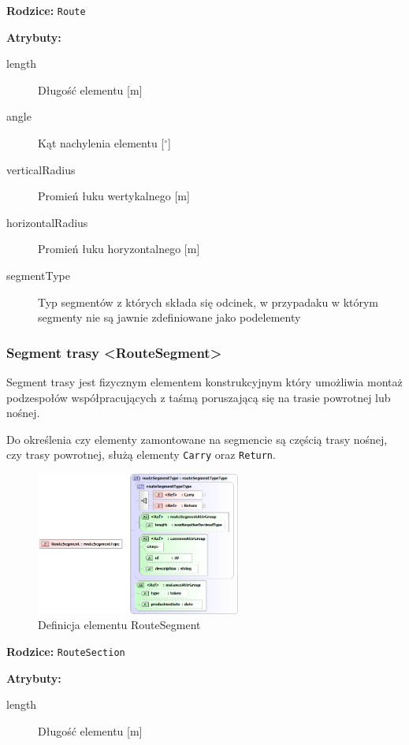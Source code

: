 \documentclass[12pt,a4paper]{article}
\begin{document}
\noindent\textbf{Rodzice:} \texttt{Route}

\noindent\textbf{Atrybuty:}
\begin{description}
\item[length] Długość elementu [m]
\item[angle] Kąt nachylenia elementu [$^\circ$]
\item[verticalRadius] Promień łuku wertykalnego [m]
\item[horizontalRadius] Promień łuku horyzontalnego [m]
\item[segmentType] Typ segmentów z których składa się odcinek, w przypadaku w
  którym segmenty nie są jawnie zdefiniowane jako podelementy
\end{description}


\subsubsection{Segment trasy <RouteSegment>}
Segment trasy jest fizycznym elementem konstrukcyjnym który umożliwia montaż
podzespołów współpracujących z taśmą poruszającą się na trasie powrotnej lub
nośnej.

Do określenia czy elementy zamontowane na segmencie są częścią trasy nośnej, czy
trasy powrotnej, służą elementy {\tt Carry} oraz {\tt Return}.

\begin{figure}[H]
  \centering
  \includegraphics[width=0.6\textwidth]{png/liquid/RouteSegment}
  \caption{Definicja elementu RouteSegment}
  \label{fig:routeSegment-xsd}
\end{figure}

\noindent\textbf{Rodzice:} \texttt{RouteSection}

\noindent\textbf{Atrybuty:}
\begin{description}
\item[length] Długość elementu [m]
\end{description}
\end{document}

